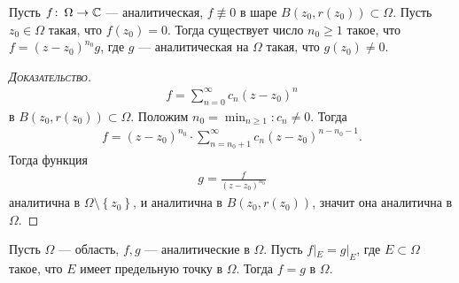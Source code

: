 \begin{lm}
 Пусть $ f\colon\,\Omega \to \mathbb{C} $ --- аналитическая, $ f \not\equiv 0 $ в шаре $ B(z_0,r(z_0)) \subset \Omega $. Пусть $ z_0 \in \Omega $ такая, что $ f(z_0) = 0 $. Тогда существует число $ n_0 \geqslant 1 $ такое, что $ f = (z - z_0)^{n_0}g $, где $ g $ --- аналитическая на $ \Omega $ такая, что $ g(z_0) \neq 0 $.
\end{lm}
\begin{proof}[\normalfont\textsc{Доказательство}]
 \begin{align*}
  f = \sum_{n=0}^{\infty}c_n(z-z_0)^{n}
 \end{align*} в $ B(z_0, r(z_0)) \subset \Omega $. Положим $ n_0 = \min_{n \geqslant 1} : c_n \neq 0 $. Тогда
 \begin{align*}
  f = (z - z_0)^{n_0} \cdot \sum_{n=n_0 + 1}^{\infty} c_n(z-z_0)^{n - n_0 - 1}.
 \end{align*} Тогда функция
 \begin{align*}
  g = \frac{f}{(z - z_0)^{n_0}}
 \end{align*}  аналитична в $ \Omega \setminus \left\{ z_0 \right\} $, и аналитична в $ B(z_0, r(z_0)) $, значит она аналитична в $ \Omega $.
\end{proof}
\begin{thm}
Пусть $ \Omega $ --- область, $ f,g $ --- аналитические в $ \Omega $. Пусть $ f |_E = g|_E $, где $ E \subset \Omega $ такое, что $ E $ имеет предельную точку в $ \Omega $. Тогда $ f = g $ в $ \Omega $.
\end{thm}

